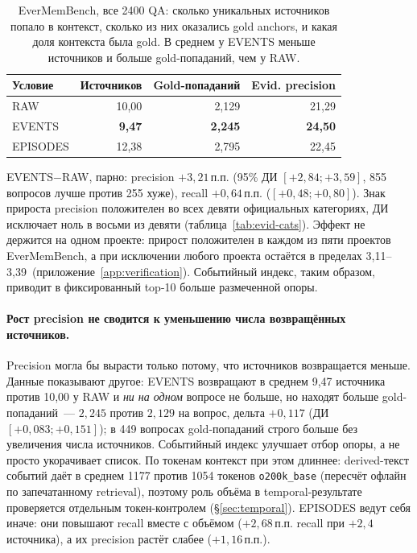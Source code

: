 \documentclass[11pt,a4paper]{article}
\newcommand{\raw}{RAW}
\newcommand{\events}{EVENTS}
\newcommand{\episodes}{EPISODES}
\newcommand{\pp}{\,\text{п.п.}}
\begin{document}
\begin{table}[ht]
\centering\small
\begin{tabular}{lrrr}
\toprule
Условие & Источников & Gold-попаданий & Evid. precision\\
\midrule
\raw{}      & 10,00 & 2,129 & 21,29\\
\events{}   & \textbf{9,47} & \textbf{2,245} & \textbf{24,50}\\
\episodes{} & 12,38 & 2,795 & 22,45\\
\bottomrule
\end{tabular}
\caption{EverMemBench, все 2400 QA: сколько уникальных источников попало в
контекст, сколько из них оказались gold anchors, и какая доля контекста была
gold. В среднем у \events{} меньше источников и больше gold-попаданий, чем у \raw{}.}
\label{tab:delivery}
\end{table}

\events{}$-$\raw{}, парно: precision $+3{,}21\pp$ (95\% ДИ $[+2{,}84;+3{,}59]$,
855 вопросов лучше против 255 хуже), recall
$+0{,}64\pp$ ($[+0{,}48;+0{,}80]$). Знак прироста precision положителен во всех
девяти официальных категориях, ДИ исключает ноль в восьми из девяти
(таблица~\ref{tab:evid-cats}). Эффект не держится на одном проекте: прирост
положителен в каждом из пяти проектов EverMemBench, а при исключении любого
проекта остаётся в пределах 3,11--3,39\pp{} (приложение~\ref{app:verification}).
Событийный индекс, таким образом, приводит в фиксированный top-10 больше
размеченной опоры.

\paragraph{Рост precision не сводится к уменьшению числа возвращённых источников.}
Precision могла бы вырасти только потому, что источников возвращается меньше.
Данные показывают другое: \events{} возвращают в среднем 9,47 источника против
10,00 у \raw{} и \emph{ни на одном} вопросе не больше, но находят больше
gold-попаданий~--- $2{,}245$ против $2{,}129$ на вопрос, дельта $+0{,}117$ (ДИ
$[+0{,}083;+0{,}151]$); в 449 вопросах gold-попаданий строго больше без
увеличения числа источников. Событийный индекс улучшает отбор опоры, а не
просто укорачивает список. По токенам контекст при этом длиннее: derived-текст
событий даёт в среднем 1177 против 1054 токенов \texttt{o200k\_base} (пересчёт
офлайн по запечатанному retrieval), поэтому роль объёма в temporal-результате
проверяется отдельным токен-контролем (§\ref{sec:temporal}). \episodes{} ведут
себя иначе: они повышают recall вместе с объёмом ($+2{,}68\pp$ recall при $+2{,}4$
источника), а их precision растёт слабее ($+1{,}16\pp$).
\end{document}

